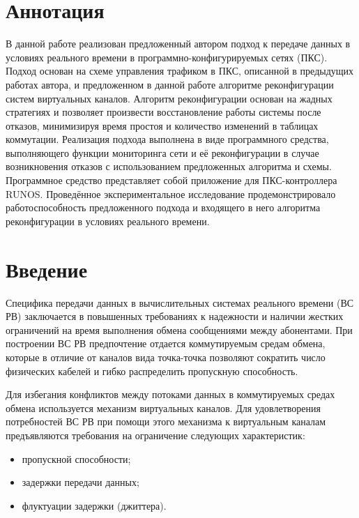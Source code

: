 \documentclass[12pt, a4paper]{article}
\begin{document}
\section*{Аннотация}
В данной работе реализован предложенный автором подход к передаче данных в условиях реального времени в программно-конфигурируемых сетях (ПКС). Подход основан на схеме управления трафиком в ПКС, описанной в предыдущих работах автора, и предложенном в данной работе алгоритме реконфигурации систем виртуальных каналов. Алгоритм реконфигурации основан на жадных стратегиях и позволяет произвести восстановление работы системы после отказов, минимизируя время простоя и количество изменений в таблицах коммутации. Реализация подхода выполнена в виде программного средства, выполняющего функции мониторинга сети и её реконфигурации в случае возникновения отказов с использованием предложенных алгоритма и схемы. Программное средство представляет собой приложение для ПКС-контроллера RUNOS. Проведённое экспериментальное исследование продемонстрировало работоспособность предложенного подхода и входящего в него алгоритма реконфигурации в условиях реального времени.

\renewcommand{\contentsname}{Содержание}
\tableofcontents

\section*{Введение}
Специфика передачи данных в вычислительных системах реального времени (ВС РВ) заключается в повышенных требованиях к надежности и наличии жестких ограничений на время выполнения обмена сообщениями между абонентами. При построении ВС РВ предпочтение отдается коммутируемым средам обмена, которые в отличие от каналов вида точка-точка позволяют сократить число физических кабелей и гибко распределить пропускную способность.

Для избегания конфликтов между потоками данных в коммутируемых средах обмена используется механизм виртуальных каналов. Для удовлетворения потребностей ВС РВ при помощи этого механизма к виртуальным каналам предъявляются требования на ограничение следующих характеристик:
\begin{itemize}
	\item пропускной способности;
	\item задержки передачи данных;
	\item флуктуации задержки (джиттера).
\end{itemize}
\end{document}

